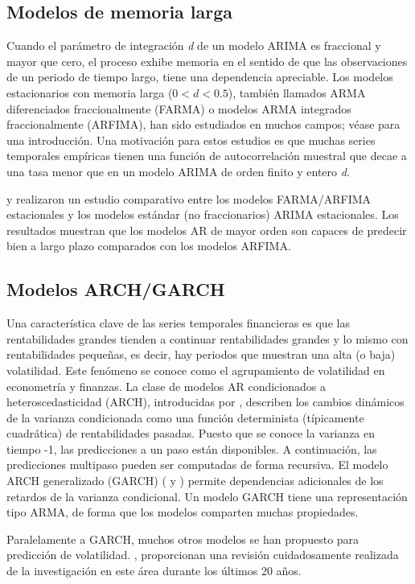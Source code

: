 \documentclass{llncs}
\begin{document}
\subsection{Modelos de memoria larga}
Cuando el parámetro de integración \emph{d} de un modelo ARIMA es fraccional y mayor que cero, el proceso exhibe memoria en el sentido de que las observaciones de un periodo de tiempo largo, tiene una dependencia apreciable. Los modelos estacionarios con memoria larga ($0 < d < 0.5$), también llamados ARMA diferenciados fraccionalmente (FARMA) o modelos ARMA integrados fraccionalmente (ARFIMA), han sido estudiados en muchos campos; véase \cite{Granger198015} para una introducción. Una motivación para estos estudios es que muchas series temporales empíricas tienen una función de autocorrelación muestral que decae a una tasa menor que en un modelo ARIMA de orden finito y entero \emph{d}.

\cite{Ray1993255} y \cite{Ray1993511} realizaron un estudio comparativo entre los modelos FARMA/ARFIMA estacionales y los modelos estándar (no fraccionarios) ARIMA estacionales. Los resultados muestran que los modelos AR de mayor orden son capaces de predecir bien a largo plazo comparados con los modelos ARFIMA. 

\subsection{Modelos ARCH/GARCH}
Una característica clave de las series temporales financieras es que las rentabilidades grandes tienden a continuar rentabilidades grandes y lo mismo con rentabilidades pequeñas, es decir, hay periodos que muestran una alta (o baja) volatilidad. Este fenómeno se conoce como el agrupamiento de volatilidad en econometría y finanzas. La clase de modelos AR condicionados a heteroscedasticidad (ARCH), introducidas por \cite{Engle1982987}, describen los cambios dinámicos de la varianza condicionada como una función determinista (típicamente cuadrática) de rentabilidades pasadas. Puesto que se conoce la varianza en tiempo -1, las predicciones a un paso están disponibles. A continuación, las predicciones multipaso pueden ser computadas de forma recursiva. El modelo ARCH generalizado (GARCH) (\cite{Bollerslev19942959} y \cite{Taylor1987159}) permite dependencias adicionales de los retardos de la varianza condicional. Un modelo GARCH tiene una representación tipo ARMA, de forma que los modelos comparten muchas propiedades.

Paralelamente a GARCH, muchos otros modelos se han propuesto para predicción de volatilidad.  \cite{Poon2003478}, proporcionan una revisión cuidadosamente realizada de la investigación en este área durante los últimos 20 años. 
\end{document}
